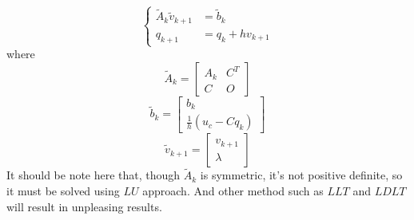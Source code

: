 \documentclass[twocolumn]{article}
\begin{document}
\[
\left\{ \begin{array}{rl}
    \tilde{A}_k \tilde{v} _{k+1}  &= \tilde{b}_k\\
    {q} _{k+1}  &= q _{k}  + hv _{k+1}
  \end{array} \right.\nonumber
\]
where
\[
    \tilde{A}_k = 
    \left[ \begin{array}{cc}
        A_k & C^T\\
        C & O
      \end{array} \right]
\]
\[
    \tilde{b}_k =     
    \left[ \begin{array}{c}
        b_k\\
        \frac{1}{h}(u_c - Cq_k)
      \end{array} \right]    
\]
\[
    \tilde{v}_{k+1} = 
    \left[ \begin{array}{c}
        v_{k+1} \\
        \lambda
      \end{array} \right] 
\]
It should be note here that, though $\tilde{A}_k$ is symmetric, it's not
positive definite, so it must be solved using $LU$ approach. And other method
such as $LLT$ and $LDLT$ will result in unpleasing results.
\end{document}

